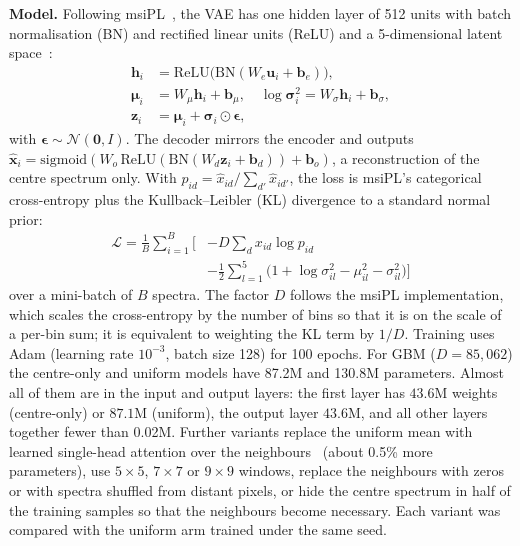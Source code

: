 \textbf{Model.} Following msiPL~\citep{abdelmoula2021peak}, the VAE has one
hidden layer of 512 units with batch normalisation (BN) and rectified linear
units (ReLU) and a 5-dimensional latent
space~\citep{kingma2014autoencoding}:
\begin{align}
\mathbf{h}_i &= \mathrm{ReLU}\big(\mathrm{BN}(W_e\mathbf{u}_i+\mathbf{b}_e)\big),\\
\boldsymbol{\mu}_i &= W_\mu\mathbf{h}_i+\mathbf{b}_\mu,\quad
\log\boldsymbol{\sigma}^2_i = W_\sigma\mathbf{h}_i+\mathbf{b}_\sigma,\\
\mathbf{z}_i&=\boldsymbol{\mu}_i+\boldsymbol{\sigma}_i\odot\boldsymbol{\epsilon},
\end{align}
with $\boldsymbol{\epsilon}\sim\mathcal{N}(\mathbf{0},I)$. The decoder mirrors
the encoder and outputs $\hat{\mathbf{x}}_i=\mathrm{sigmoid}(W_o\,
\mathrm{ReLU}(\mathrm{BN}(W_d\mathbf{z}_i+\mathbf{b}_d))+\mathbf{b}_o)$, a reconstruction of the centre
spectrum only. With $p_{id}=\hat{x}_{id}/\sum_{d'}\hat{x}_{id'}$, the loss is
msiPL's categorical cross-entropy plus the Kullback--Leibler (KL) divergence to a
standard normal prior:
\begin{equation}
\begin{aligned}
\mathcal{L}=\frac{1}{B}\sum_{i=1}^{B}\Big[&-D\sum_{d}x_{id}\log p_{id}\\
&-\tfrac{1}{2}\sum_{l=1}^{5}\big(1+\log\sigma^2_{il}-\mu_{il}^2-\sigma^2_{il}\big)\Big]
\end{aligned}
\end{equation}
over a mini-batch of $B$ spectra. The factor $D$ follows the msiPL
implementation, which scales the cross-entropy by the number of bins so that
it is on the scale of a per-bin sum; it is equivalent to weighting the KL term
by $1/D$.
Training uses Adam (learning rate $10^{-3}$, batch size 128) for 100 epochs.
For GBM ($D=85{,}062$) the centre-only and uniform models have 87.2M and
130.8M parameters. Almost all of them are in the input and output layers: the
first layer has $43.6$M weights (centre-only) or $87.1$M (uniform), the output
layer $43.6$M, and all other layers together fewer than 0.02M. Further variants replace the uniform mean with
learned single-head attention over the neighbours~\citep{vaswani2017attention}
(about 0.5\% more parameters), use $5\times5$, $7\times7$ or $9\times9$
windows, replace the neighbours with zeros or with spectra shuffled from distant
pixels, or hide the centre spectrum in half of the training samples so that the
neighbours become necessary. Each variant was compared with the uniform arm
trained under the same seed.

